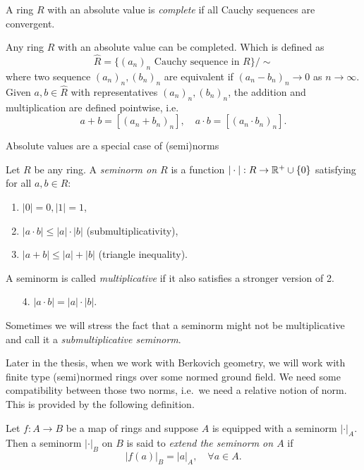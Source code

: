 \begin{definition}
	A ring $R$ with an absolute value is \emph{complete} if all Cauchy sequences are convergent. 
\end{definition}
\begin{definition}
	Any ring $R$ with an absolute value can be completed. Which is defined as \[
		\widehat{R} = \{(a_n)_n \text{ Cauchy sequence in } R\} / \sim
	\] 
	where two sequence $(a_n)_n, (b_n)_n$ are equivalent if $(a_n - b_n)_n \to 0$ as $n \to \infty$.
	Given  $a, b \in \widehat{R}$ with representatives $(a_n)_n, (b_n)_n$, the addition and multiplication are defined pointwise, i.e.\ \[
		a + b = [(a_n + b_n)_n], \quad a\cdot b = [(a_n \cdot b_n)_n]
	.\]
\end{definition}

Absolute values are a special case of (semi)norms
\begin{definition}
	Let $R$ be any ring. A \emph{seminorm on $R$} is a function $|\cdot |: R \to \mathbb{R}^{+} \cup \{0\} $ satisfying for all $a, b \in R$:
	\begin{enumerate}
		\item $|0| = 0, |1| = 1$,
		\item $|a \cdot b| \le |a| \cdot |b|$  (submultiplicativity),
		\item $|a + b| \le |a| + |b|$ (triangle inequality).
	\end{enumerate}
	A seminorm is called \emph{multiplicative} if it also satisfies a stronger version of 2. 
	\begin{enumerate}
		\item [4.]  $|a \cdot  b| = |a| \cdot |b|$.
	\end{enumerate}
\end{definition}
Sometimes we will stress the fact that a seminorm might not be multiplicative and call it a \emph{submultiplicative seminorm}. 


Later in the thesis, when we work with Berkovich geometry, we will work with finite type (semi)normed rings over some normed ground field. 
We need some compatibility between those two norms, i.e.\ we need a relative notion of norm. 
This is provided by the following definition. 
\begin{definition}
	Let $f: A \to B$ be a map of rings and suppose $A$ is equipped with a seminorm $|\cdot |_A$. 
	Then a seminorm $|\cdot |_B$ on $B$ is said to \emph{extend the seminorm on $A$} if \[
		|f(a)|_B = |a|_A, \quad \forall a \in A
	.\] 
\end{definition}

